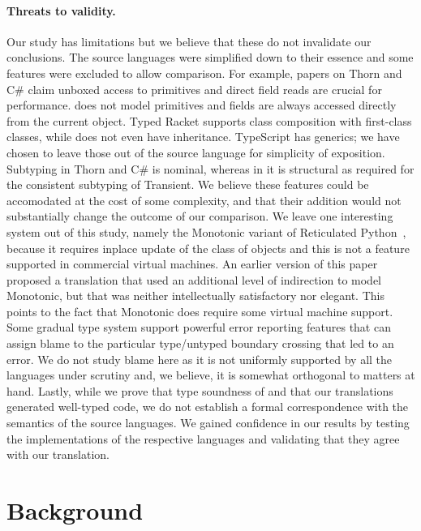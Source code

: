 \documentclass[acmlarge, anonymous, authordraft, review]{acmart} %
\begin{document}
\paragraph{Threats to validity.} Our study has limitations but we believe
that these do not invalidate our conclusions. The source languages were
simplified down to their essence and some features were excluded to allow
comparison.  For example, papers on Thorn and C\# claim unboxed access to
primitives and direct field reads are crucial for performance. \kafka does
not model primitives and fields are always accessed directly from the
current object. Typed Racket supports class composition with first-class
classes, while \kafka does not even have inheritance. TypeScript has
generics; we have chosen to leave those out of the source language for
simplicity of exposition. Subtyping in Thorn and C\# is nominal, whereas in
\kafka it is structural as required for the consistent subtyping of
Transient.  We believe these features could be accomodated at the cost of
some complexity, and that their addition would not substantially change the
outcome of our comparison. We leave one interesting system out of this
study, namely the Monotonic variant of Reticulated Python~\cite{siek14},
because it requires inplace update of the class of objects and this is not a
feature supported in commercial virtual machines. An earlier version of this
paper proposed a translation that used an additional level of indirection to
model Monotonic, but that was neither intellectually satisfactory nor
elegant.  This points to the fact that Monotonic does require some virtual
machine support.  Some gradual type system support powerful error reporting
features that can assign blame to the particular type/untyped boundary
crossing that led to an error. We do not study blame here as it is not
uniformly supported by all the languages under scrutiny and, we believe, it
is somewhat orthogonal to matters at hand.  Lastly, while we prove that type
soundness of \kafka and that our translations generated well-typed code, we
do not establish a formal correspondence with the semantics of the source
languages. We gained confidence in our results by testing the
implementations of the respective languages and validating that they agree
with our translation.

\medskip

\section{Background}
\end{document}
